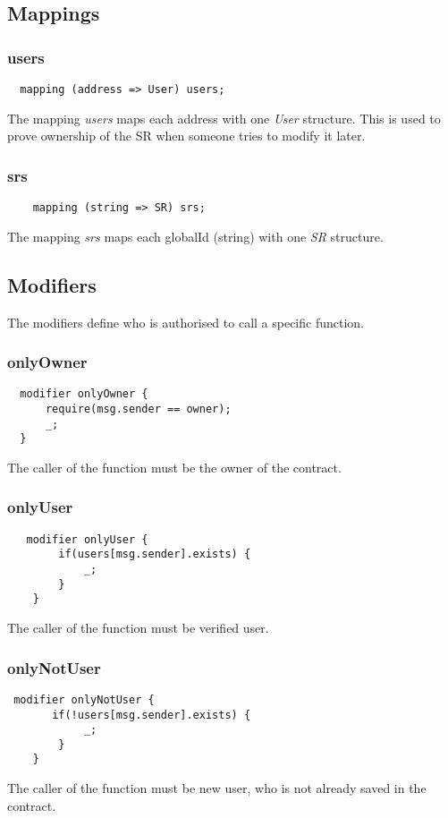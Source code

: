 \subsection{Mappings}
\subsubsection{users}
\begin{lstlisting}
  mapping (address => User) users;
\end{lstlisting}
The mapping \textit{users} maps each address with one \textit{User} structure. 
This is used to prove ownership of the SR when someone tries to modify it later.
\subsubsection{srs}
\begin{lstlisting}
    mapping (string => SR) srs;
\end{lstlisting}
The mapping \textit{srs} maps each globalId (string) with one \textit{SR} structure.

\subsection{Modifiers}
The modifiers define who is authorised to call a specific function.
\subsubsection{onlyOwner}
\begin{lstlisting}
  modifier onlyOwner {
      require(msg.sender == owner);
      _;
  }
\end{lstlisting}
The caller of the function must be the owner of the contract.

\subsubsection{onlyUser}
\begin{lstlisting}
   modifier onlyUser {
        if(users[msg.sender].exists) {
            _;
        }
    }
\end{lstlisting}
The caller of the function must be verified user.

\subsubsection{onlyNotUser}
\begin{lstlisting}
 modifier onlyNotUser {
       if(!users[msg.sender].exists) {
            _;
        }
    }
\end{lstlisting}
The caller of the function must be new user, who is not already saved in the contract.

